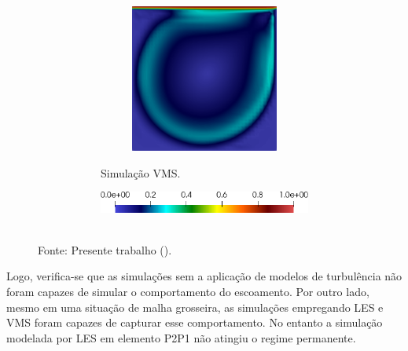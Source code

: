 \begin{figure}[h!]
\begin{subfigure}{\textwidth}
\begin{subfigure}{\textwidth}
\begin{subfigure}{.32\textwidth}
            \end{subfigure}
            \begin{subfigure}{.32\textwidth}
                \includegraphics[width=\linewidth]{Figuras/cavity-poor/VMS-TH.png}
            \end{subfigure}
            \caption{Simulação VMS.}
        \end{subfigure}
        \begin{subfigure}{.5\textwidth}\centering
            \includegraphics[width=\linewidth]{Figuras/cavity-poor/legenda.png}
        \end{subfigure}
    \end{subfigure}
    \label{fig:cavity-coarse}
    \\Fonte: Presente trabalho (\the\year).
\end{figure}

Logo, verifica-se que as simulações sem a aplicação de modelos de turbulência não foram capazes de simular o comportamento do escoamento. Por outro lado, mesmo em uma situação de malha grosseira, as simulações empregando LES e VMS foram capazes de capturar esse comportamento. No entanto a simulação modelada por LES em elemento P2P1 não atingiu o regime permanente.